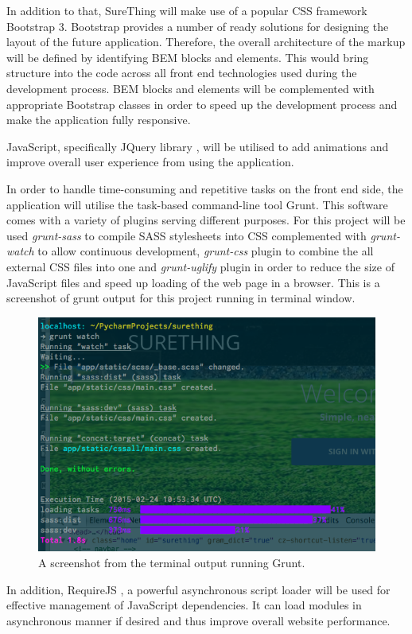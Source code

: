 In addition to that, SureThing will make use of a popular CSS framework Bootstrap 3. Bootstrap provides a number of ready solutions for designing the layout of the future application. Therefore, the overall architecture of the markup will be defined by identifying BEM blocks and elements. This would bring structure into the code across all front end technologies used during the development process. BEM blocks and elements will be complemented with appropriate Bootstrap classes in order to speed up the development process and make the application fully responsive.
 
JavaScript, specifically JQuery library \cite{documentation:jQuery}, will be utilised to add animations and improve overall user experience from using the application.  

In order to handle time-consuming and repetitive tasks on the front end side, the application will utilise the task-based command-line tool Grunt. This software comes with a variety of plugins serving different purposes. For this project will be used \emph{grunt-sass} to compile SASS stylesheets into CSS complemented with \emph{grunt-watch} to allow continuous development, \emph{grunt-css} plugin to combine the all external CSS files into one and \emph{grunt-uglify} plugin in order to reduce the size of JavaScript files and speed up loading of the web page in a browser. This is a screenshot of grunt output for this project running in terminal window.

\begin{figure}[H]
	\begin{center}
		\includegraphics[width=.60\linewidth]{impl/images/gruntInAction}
		\caption{A screenshot from the terminal output running Grunt.} \label{fig:using:gruntinaction}
	\end{center}
\end{figure}
	
In addition, RequireJS  \cite{documentation:RequireJS}, a powerful asynchronous script loader will be used for effective management of JavaScript dependencies. It can load modules in asynchronous manner if desired and thus improve overall website performance.

